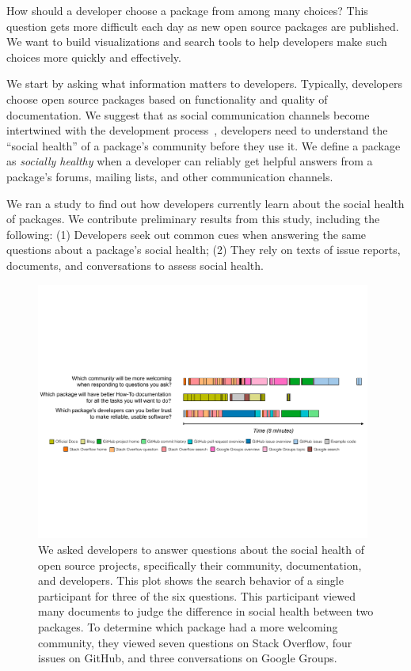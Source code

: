 How should a developer choose a package from among many choices?
This question gets more difficult each day as new open source packages are published.
We want to build visualizations and search tools to help developers make such choices more quickly and effectively.

We start by asking what information matters to developers.
Typically, developers choose open source packages based on functionality and quality of documentation.
We suggest that as social communication channels become intertwined with the development process~\cite{storey_revolution_2014},
developers need to understand the ``social health'' of a package's community before they use it.
We define a package as \textit{socially healthy} when a developer can reliably get helpful answers from a package's forums, mailing lists, and other communication channels.

We ran a study to find out how developers currently learn about the social health of packages.
We contribute preliminary results from this study, including the following:
(1) Developers seek out common cues when answering the same questions about a package's social health;
(2) They rely on texts of issue reports, documents, and conversations to assess social health.

\begin{figure}
\centering
\includegraphics[width=0.98\textwidth]{figures/visits}
\caption{%
We asked developers to answer questions about the social health of open source projects,
specifically their community, documentation, and developers.
This plot shows the search behavior of a single participant for three of the six questions.
This participant viewed many documents to judge the difference in social health between two packages.
To determine which package had a more welcoming community, they viewed seven questions on Stack Overflow, four issues on GitHub, and three conversations on Google Groups.
}
\label{fig:visits}
\end{figure}
